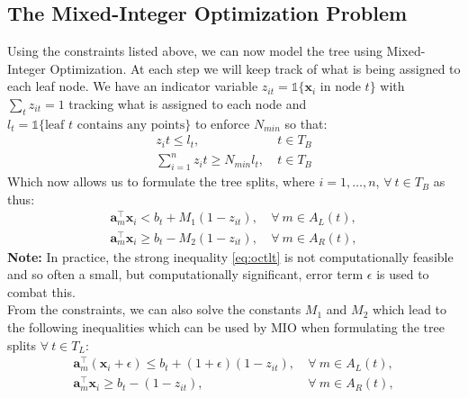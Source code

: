 \documentclass[11pt,a4paper]{report}
\begin{document}
\subsection{The Mixed-Integer Optimization Problem}
Using the constraints listed above, we can now model the tree using Mixed-Integer Optimization.
At each step we will keep track of what is being assigned to each leaf node.
We have an indicator variable $z_{it} = \mathds{1}\{\textbf{x}_i \text{ in node } t\}$ with $\sum_{t} z_{it} = 1$ tracking what is assigned to each node and $l_t = \mathds{1}\{\text{leaf } t \text{ contains any points}\}$ to enforce $N_{min}$ so that:
\begin{align}
       z_it \leq l_t, & \ t \in T_B \label{eq:octrestrictions1}\\
    \sum_{i=1}^{n} z_it \geq N_{min} l_t, & \ t \in T_B \label{eq:octrestrictions2} 
\end{align}
Which now allows us to formulate the tree splits, where $i = 1,\dots,n$, $\forall \ t \in T_B$ as thus:
  \begin{align}
    \mathbf{a}_m^\intercal \mathbf{x}_i < b_t + M_1 (1 - z_{it}),  & \ \forall \ m \in A_L (t), \label{eq:octlt}\\
    \mathbf{a}_m^\intercal \mathbf{x}_i \geq b_t - M_2 (1 - z_{it}), & \ \forall \ m \in A_R (t), \label{eq:octgeq}  
  \end{align}
\textbf{Note:} In practice, the strong inequality \ref{eq:octlt} is not computationally feasible and so often a small, but computationally significant, error term $\epsilon$ is used to combat this.
\medskip\\
From the constraints, we can also solve the constants $M_1$ and $M_2$ which lead to the following inequalities which can be used by MIO when formulating the tree splits $\forall \ t \in T_L$:
  \begin{align}
    \mathbf{a}_m^\intercal (\mathbf{x}_i + \epsilon) \leq b_t + (1 + \epsilon) (1 - z_{it}),  & \  \forall \ m \in A_L (t), \label{eq:finoctleq}\\
    \mathbf{a}_m^\intercal \mathbf{x}_i \geq b_t - (1 - z_{it}), & \ \forall \ m \in A_R (t), \label{eq:finoctgeq}  
  \end{align}
\end{document}
